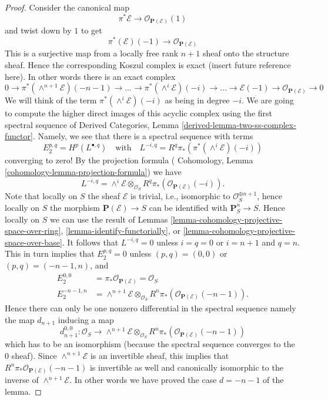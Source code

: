 \begin{proof}
Consider the canonical map
$$
\pi^*\mathcal{E} \longrightarrow \mathcal{O}_{\mathbf{P}(\mathcal{E})}(1)
$$
and twist down by $1$ to get
$$
\pi^*(\mathcal{E})(-1) \longrightarrow \mathcal{O}_{\mathbf{P}(\mathcal{E})}
$$
This is a surjective map from a locally free rank $n + 1$ sheaf onto
the structure sheaf. Hence the corresponding Koszul complex is
exact (insert future reference here). In other words there is an
exact complex
$$
0 \to
\pi^*(\wedge^{n + 1}\mathcal{E})(-n - 1) \to
\ldots \to
\pi^*(\wedge^i\mathcal{E})(-i) \to
\ldots \to
\mathcal{E}(-1) \to
\mathcal{O}_{\mathbf{P}(\mathcal{E})} \to 0
$$
We will think of the term $\pi^*(\wedge^i\mathcal{E})(-i)$ as being
in degree $-i$.
We are going to compute the higher direct images
of this acyclic complex using the first spectral sequence of
Derived Categories, Lemma \ref{derived-lemma-two-ss-complex-functor}.
Namely, we see that there is a spectral sequence with terms
$$
E_2^{p, q} = H^p(L^{\bullet, q})
\quad
\text{with}
\quad
L^{-i, q} = R^q\pi_*\left(\pi^*(\wedge^i\mathcal{E})(-i)\right)
$$
converging to zero!
By the projection formula (
Cohomology, Lemma \ref{cohomology-lemma-projection-formula})
we have
$$
L^{-i, q} = \wedge^i\mathcal{E} \otimes_{\mathcal{O}_S}
R^q\pi_*\left(\mathcal{O}_{\mathbf{P}(\mathcal{E})}(-i)\right).
$$
Note that locally on $S$ the sheaf $\mathcal{E}$ is trivial,
i.e., isomorphic to $\mathcal{O}_S^{\oplus n + 1}$, hence locally on
$S$ the morphism $\mathbf{P}(\mathcal{E}) \to S$ can be identified
with $\mathbf{P}^n_S \to S$. Hence
locally on $S$ we can use the result of Lemmas
\ref{lemma-cohomology-projective-space-over-ring},
\ref{lemma-identify-functorially}, or
\ref{lemma-cohomology-projective-space-over-base}.
It follows that $L^{-i, q} = 0$ unless $i = q = 0$
or $i = n + 1$ and $q = n$. This in turn implies that
$E_2^{p, q} = 0$ unless $(p, q) = (0, 0)$ or
$(p, q) = (-n - 1, n)$, and
\begin{align*}
E_2^{0, 0} & = \pi_*\mathcal{O}_{\mathbf{P}(\mathcal{E})} = \mathcal{O}_S
\\
E_2^{-n - 1, n} & = \wedge^{n + 1}\mathcal{E} \otimes_{\mathcal{O}_S}
R^n\pi_*\left(\mathcal{O}_{\mathbf{P}(\mathcal{E})}(-n - 1)\right).
\end{align*}
Hence there can only be one nonzero
differential in the spectral sequence namely the map
$d_{n + 1}$ inducing a map
$$
d_{n + 1}^{0, 0} :
\mathcal{O}_S
\longrightarrow
\wedge^{n + 1}\mathcal{E} \otimes_{\mathcal{O}_S}
R^n\pi_*\left(\mathcal{O}_{\mathbf{P}(\mathcal{E})}(-n - 1)\right)
$$
which has to be an isomorphism (because the spectral sequence converges
to the $0$ sheaf). Since $\wedge^{n + 1}\mathcal{E}$ is an invertible
sheaf, this implies that
$R^n\pi_*\mathcal{O}_{\mathbf{P}(\mathcal{E})}(-n - 1)$ is invertible
as well and canonically isomorphic to the inverse of
$\wedge^{n + 1}\mathcal{E}$. In other words we have proved the case
$d = - n - 1$ of the lemma.


\end{proof}
